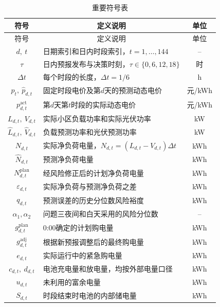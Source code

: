 \documentclass[UTF8]{ctexart}
\renewcommand{\arraystretch}{0.95}
\begin{document}
    \begingroup
    \renewcommand{\arraystretch}{1.2}
    \begin{longtable}{clc}
        \caption{重要符号表}
        \label{tab:important_symbols}\\
        \toprule
        符号 & \multicolumn{1}{c}{定义说明} & 单位 \\
        \midrule
        \endfirsthead
        \toprule
        符号 & \multicolumn{1}{c}{定义说明} & 单位 \\
        \midrule
        \endhead
        \bottomrule
        \endlastfoot
        $d,\ t$ & 日期索引和日内时段索引，$t=1,\ldots,144$ & -- \\
        $\tau$ & 日内预报发布与决策时刻，$\tau\in\{0,6,12,18\}$ & 时 \\
        $\Delta t$ & 每个时段的长度，$\Delta t=1/6$ & h \\
        $p_t,\ \widehat p_{d,t}$ & 固定时段电价及第$d$天的预测动态电价 & 元/kWh \\
        $p_{d,t}^{\mathrm{act}}$ & 第$d$天第$t$时段的实际动态电价 & 元/kWh \\
        $L_{d,t},\ V_{d,t}$ & 实际小区负载功率和实际光伏功率 & kW \\
        $\widehat L_{d,t},\ \widehat V_{d,t}$ & 负载预测功率和光伏预测功率 & kW \\
        $N_{d,t}$ & 实际净负荷电量，$N_{d,t}=(L_{d,t}-V_{d,t})\Delta t$ & kWh \\
        $\widehat N_{d,t}$ & 预测净负荷电量 & kWh \\
        $N_{d,t}^{\mathrm{plan}}$ & 经风险修正后的计划净负荷电量 & kWh \\
        $\varepsilon_{d,t}$ & 实际净负荷与预测净负荷之差 & kWh \\
        $q_{d,t}$ & 预测误差的历史分位数风险裕度 & kWh \\
        $\alpha_1,\alpha_2$ & 问题三夜间和白天采用的风险分位数 & -- \\
        $g_{d,t}^{\mathrm{plan}}$ & 0:00确定的计划购电量 & kWh \\
        $g_{d,t}^{\mathrm{adj}}$ & 根据新预报调整后的最终购电量 & kWh \\
        $e_{d,t}$ & 实际运行中的紧急购电量 & kWh \\
        $c_{d,t},\ d_{d,t}$ & 电池充电量和放电量，均按外部电量口径 & kWh \\
        $u_{d,t}$ & 未利用的富余电量 & kWh \\
        $S_{d,t}$ & 时段结束时电池的内部储电量 & kWh \\

\end{longtable}
\end{document}
